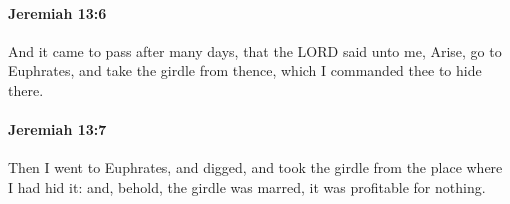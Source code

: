 		\paragraph{Jeremiah 13:6} %
			\label{JEREMIAH-13-6}

			And it came to pass after many days, that the LORD said unto me, Arise, go to Euphrates, and take the girdle from thence, which I commanded thee to hide there.


		\paragraph{Jeremiah 13:7} %
			\label{JEREMIAH-13-7}

			Then I went to Euphrates, and digged, and took the girdle from the place where I had hid it: and, behold, the girdle was marred, it was profitable for nothing.


